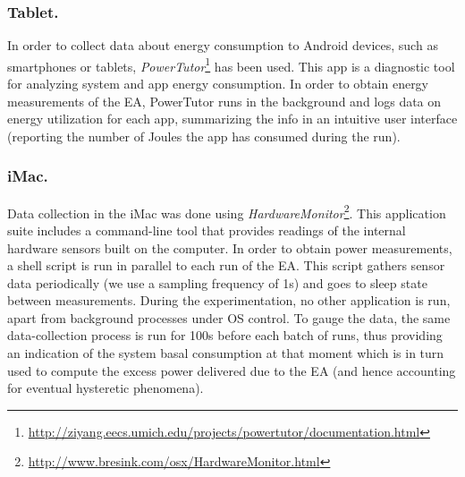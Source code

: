 

\subsubsection*{Tablet.}
In order to collect data about energy consumption to Android devices, such as smartphones or tablets, \emph{PowerTutor}\footnote{\url{http://ziyang.eecs.umich.edu/projects/powertutor/documentation.html}} \cite{powertutor2} has been used. 
This app is a diagnostic tool for analyzing system and app energy consumption.
In order to obtain energy measurements of the EA, PowerTutor runs in the background and logs data on energy utilization for each app, summarizing the info in an intuitive user interface (reporting the number of Joules the app has consumed during the run).


\subsubsection*{iMac.}
Data collection in the iMac was done using \emph{HardwareMonitor}\footnote{\url{http://www.bresink.com/osx/HardwareMonitor.html}}. 
This application suite includes a command-line tool that provides readings of the internal
hardware sensors built on the computer. In order to obtain power measurements, a shell
script is run in parallel to each run of the EA. This script gathers sensor data periodically
(we use a sampling frequency of 1s) and goes to sleep state between measurements. 
During the experimentation, no other application is run, apart from background processes 
under OS control. 
To gauge the data,
the same data-collection process is run for 100s before each batch of runs, thus providing
an indication of the system basal consumption at that moment which is in turn used to 
compute the excess power delivered due to the EA (and hence accounting for
eventual hysteretic phenomena).

